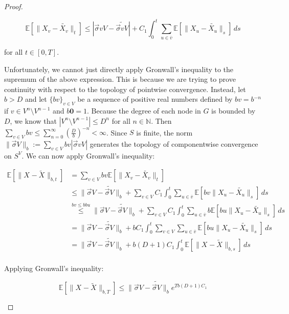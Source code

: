 \documentclass[12pt]{article}
\newcommand{\mb}{\mathbb}
\newcommand{\ov}{\overline}
\newcommand{\os}{\overset}
\newcommand{\ind}{\hspace{24pt}}
\newcommand{\ex}[1]{\mb{E}\left[#1\right]}			%
\renewcommand{\root}{\mathbf{0}}				%
\renewcommand{\v}{v}							%
\newcommand{\vv}{u}								%
\renewcommand{\S}{S}							%
\newcommand{\s}{\sigma}							%
\newcommand{\sv}{\vec{\s}}						%
\renewcommand{\b}{b}							%
\newcommand{\T}{T}								%
\renewcommand{\t}{t}							%
\newcommand{\cl}{\ov}							%
\newcommand{\degr}{D}								%
\newcommand{\pup}[1]{^{#1}}							%
\renewcommand{\G}{G}								%
\newcommand{\V}{V}									%
\renewcommand{\tt}{s}								%
\newcommand{\numb}{n}								%
\newcommand{\XState}[1]{\S^{#1}}				%
\newcommand{\rxvts}[2]{X_{#1}{#2}}					%
\newcommand{\const}[1]{C_{#1}}						%
\newcommand{\alt}{\widetilde}						%
\begin{document}
\begin{proof}
\begin{enumerate}[(a)]
\[\ex{\|\rxvts{\v}{} - \alt{\rxvts{\v}{}}\|_\t} \leq |\sv{\v}{\V} - \alt{\sv{\v}{\V}}| + \const{1}\int_0^\t \sum_{\vv\in \cl{\v}} \ex{\|\rxvts{\vv}{} - \alt{\rxvts{\vv}{}}\|_\tt}\,d\tt\]

for all \(\t \in [0,\T]\).

\ind Unfortunately, we cannot just directly apply Gronwall's inequality to the supremum of the above expression. This is because we are trying to prove continuity with respect to the topology of pointwise convergence. Instead, let \(\b{} > \degr\) and let \(\{\b{\v}\}_{\v \in \V}\) be a sequence of positive real numbers defined by \(\b{\v} = \b{}^{-\numb}\) if \(\v \in \V\pup{\numb}\setminus \V\pup{\numb-1}\) and \(\b{\root} = 1\). Because the degree of each node in \(\G\) is bounded by \(\degr\), we know that \(|\V\pup{\numb}\setminus \V\pup{\numb-1}| \leq \degr^{\numb}\) for all \(\numb\in \mb{N}\). Then \(\sum_{\v \in \V} \b{\v} \leq \sum_{\numb=0}^\infty \left(\frac{\degr}{\b{}}\right)^{-\numb} < \infty\). Since \(\S\) is finite, the norm \(\|\sv{}{\V}\|_{\b{}} := \sum_{\v \in \V} \b{\v}|\sv{\v}{\V}|\) generates the topology of componentwise convergence on \(\S^\V\). We can now apply Gronwall's inequality:

\begin{align*}
\ex{\|\rxvts{}{} - \alt{\rxvts{}{}}\|_{\b{},\t}} &= \sum_{\v \in \V} \b{\v}\ex{\|\rxvts{\v}{} - \alt{\rxvts{\v}{}}\|_\t}\\
&\leq \|\sv{}{\V} - \alt{\sv{}{\V}}\|_{\b{}} + \sum_{\v \in \V}\const{1}\int_0^\t \sum_{\vv \in \cl{\v}} \ex{\b{\v}\|\rxvts{\vv}{} - \alt{\rxvts{\vv}{}}\|_\tt}\,d\tt\\
&\os{\b{\v}\leq \b{}\b{\vv}}{\leq} \|\sv{}{\V} - \alt{\sv{}{\V}}\|_{\b{}} + \sum_{\v \in \V}\const{1}\int_0^\t \sum_{\vv \in \cl{\v}} \b{}\ex{\b{\vv}\|\rxvts{\vv}{} - \alt{\rxvts{\vv}{}}\|_\tt}\,d\tt\\
&= \|\sv{}{\V} - \alt{\sv{}{\V}}\|_{\b{}} + \b{}\const{1}\int_0^\t \sum_{\v \in \V}\sum_{\vv \in \cl{\v}} \ex{\b{\vv}\|\rxvts{\vv}{} - \alt{\rxvts{\vv}{}}\|_\tt}\,d\tt\\
&=\|\sv{}{\V} - \alt{\sv{}{\V}}\|_{\b{}} + \b{}(\degr+1)\const{1}\int_0^\t \ex{\|\rxvts{}{} - \alt{\rxvts{}{}}\|_{\b{},\tt}}\,d\tt\\
\end{align*}

Applying Gronwall's inequality:

\[\ex{\|\rxvts{}{} - \alt{\rxvts{}{}}\|_{\b{},\T}} \leq \|\sv{}{\V} - \alt{\sv{}{\V}}\|_{\b{}}e^{\T\b{}(\degr+1)\const{1}}\]


\end{enumerate}
\end{proof}
\end{document}
